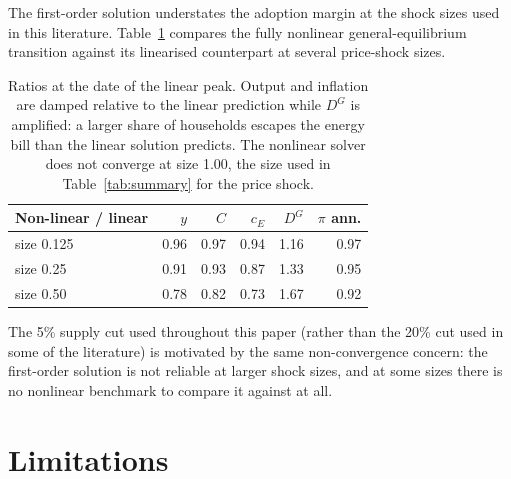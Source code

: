 \documentclass[11pt,a4paper]{article}
\begin{document}
The first-order solution understates the adoption margin at the shock sizes
used in this literature. Table~\ref{tab:nonlinear} compares the fully
nonlinear general-equilibrium transition against its linearised counterpart
at several price-shock sizes.

\begin{table}[h]\centering\small
\begin{tabular}{lrrrrr}
\toprule
Non-linear / linear & $y$ & $C$ & $c_E$ & $D^{G}$ & $\pi$ ann.\\
\midrule
size 0.125 & 0.96 & 0.97 & 0.94 & 1.16 & 0.97\\
size 0.25  & 0.91 & 0.93 & 0.87 & 1.33 & 0.95\\
size 0.50  & 0.78 & 0.82 & 0.73 & 1.67 & 0.92\\
\bottomrule
\end{tabular}
\caption{Ratios at the date of the linear peak. Output and inflation are
damped relative to the linear prediction while $D^{G}$ is amplified: a larger
share of households escapes the energy bill than the linear solution
predicts. The nonlinear solver does not converge at size 1.00, the size used
in Table~\ref{tab:summary} for the price shock.}
\label{tab:nonlinear}
\end{table}

The 5\% supply cut used throughout this paper (rather than the 20\% cut used
in some of the literature) is motivated by the same non-convergence concern:
the first-order solution is not reliable at larger shock sizes, and at some
sizes there is no nonlinear benchmark to compare it against at all.

\section{Limitations}
\label{sec:limits}
\end{document}
